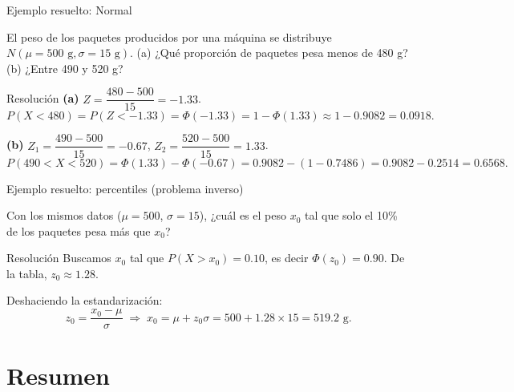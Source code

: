 \documentclass[aspectratio=169,11pt]{beamer}
\begin{document}
\begin{frame}{Ejemplo resuelto: Normal}
\begin{example}
El peso de los paquetes producidos por una máquina se distribuye $N(\mu=500\text{ g}, \sigma=15\text{ g})$. (a) ¿Qué proporción de paquetes pesa menos de 480 g? (b) ¿Entre 490 y 520 g?
\end{example}

\begin{block}{Resolución}
\textbf{(a)} $Z = \dfrac{480-500}{15} = -1.33$.
$$P(X<480) = P(Z<-1.33) = \Phi(-1.33) = 1-\Phi(1.33) \approx 1-0.9082 = 0.0918.$$

\textbf{(b)} $Z_1 = \dfrac{490-500}{15}=-0.67$, \quad $Z_2 = \dfrac{520-500}{15}=1.33$.
$$P(490<X<520) = \Phi(1.33)-\Phi(-0.67) = 0.9082 - (1-0.7486) = 0.9082-0.2514 = 0.6568.$$
\end{block}
\end{frame}

\begin{frame}{Ejemplo resuelto: percentiles (problema inverso)}
\begin{example}
Con los mismos datos ($\mu=500$, $\sigma=15$), ¿cuál es el peso $x_0$ tal que solo el 10\% de los paquetes pesa más que $x_0$?
\end{example}

\begin{block}{Resolución}
Buscamos $x_0$ tal que $P(X>x_0)=0.10$, es decir $\Phi(z_0)=0.90$. De la tabla, $z_0\approx 1.28$.

Deshaciendo la estandarización:
$$z_0 = \frac{x_0-\mu}{\sigma} \;\Rightarrow\; x_0 = \mu + z_0\sigma = 500 + 1.28\times 15 = 519.2 \text{ g}.$$
\end{block}
\end{frame}

\section{Resumen}
\end{document}
